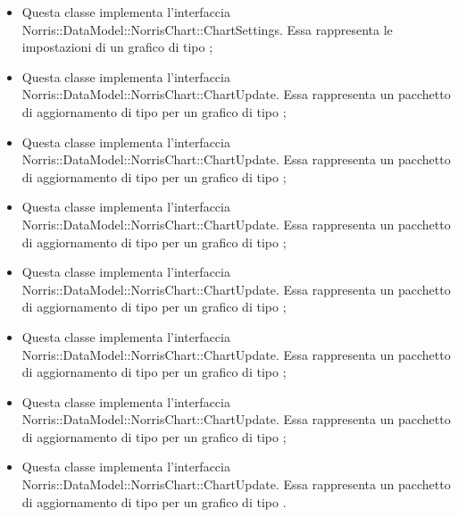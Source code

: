 \begin{itemize}
		\item {} Questa classe implementa l'interfaccia Norris::DataModel::NorrisChart::ChartSettings. Essa rappresenta le impostazioni di un grafico di tipo ;

		\item {} Questa classe implementa l'interfaccia Norris::DataModel::NorrisChart::ChartUpdate. Essa rappresenta un pacchetto di aggiornamento di tipo  per un grafico di tipo ;

		\item {} Questa classe implementa l'interfaccia Norris::DataModel::NorrisChart::ChartUpdate. Essa rappresenta un pacchetto di aggiornamento di tipo  per un grafico di tipo ;

		\item {} Questa classe implementa l'interfaccia Norris::DataModel::NorrisChart::ChartUpdate. Essa rappresenta un pacchetto di aggiornamento di tipo  per un grafico di tipo ;

		\item {} Questa classe implementa l'interfaccia Norris::DataModel::NorrisChart::ChartUpdate. Essa rappresenta un pacchetto di aggiornamento di tipo  per un grafico di tipo ;

		\item {} Questa classe implementa l'interfaccia Norris::DataModel::NorrisChart::ChartUpdate. Essa rappresenta un pacchetto di aggiornamento di tipo  per un grafico di tipo ;

		\item {} Questa classe implementa l'interfaccia Norris::DataModel::NorrisChart::ChartUpdate. Essa rappresenta un pacchetto di aggiornamento di tipo  per un grafico di tipo ;

		\item {} Questa classe implementa l'interfaccia Norris::DataModel::NorrisChart::ChartUpdate. Essa rappresenta un pacchetto di aggiornamento di tipo  per un grafico di tipo .
	\end{itemize}
